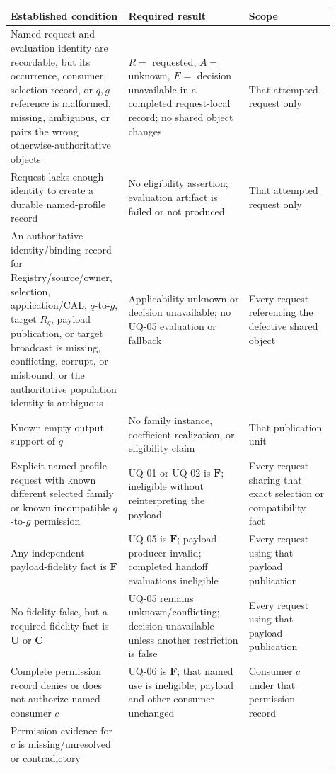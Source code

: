 \begin{longtable}{p{0.31\linewidth}p{0.35\linewidth}p{0.25\linewidth}}
\toprule
Established condition & Required result & Scope\\
\midrule
\endhead
Named request and evaluation identity are recordable, but its occurrence,
consumer, selection-record, or \(q,g\) reference is malformed, missing,
ambiguous, or pairs the wrong otherwise-authoritative objects &
\(R=\) requested, \(A=\) unknown, \(E=\) decision unavailable in a completed
request-local record; no shared object changes & That attempted request only\\
Request lacks enough identity to create a durable named-profile record &
No eligibility assertion; evaluation artifact is failed or not produced &
That attempted request only\\
An authoritative identity/binding record for Registry/source/owner,
selection, application/CAL, \(q\)-to-\(g\), target \(R_q\), payload
publication, or target broadcast is missing, conflicting, corrupt, or
misbound; or the authoritative population identity is ambiguous & Applicability unknown or decision
unavailable; no UQ-05 evaluation or fallback & Every request referencing the
defective shared object\\
Known empty output support of \(q\) & No family instance, coefficient
realization, or eligibility claim & That publication unit\\
Explicit named profile request with known different selected family or
known incompatible \(q\)-to-\(g\) permission & UQ-01 or UQ-02 is
\(\mathbf F\); ineligible without reinterpreting the payload & Every request
sharing that exact selection or compatibility fact\\
Any independent payload-fidelity fact is \(\mathbf F\) & UQ-05 is
\(\mathbf F\); payload producer-invalid; completed handoff evaluations
ineligible & Every request using that payload publication\\
No fidelity false, but a required fidelity fact is \(\mathbf U\) or
\(\mathbf C\) & UQ-05 remains unknown/conflicting; decision unavailable
unless another restriction is false & Every request using that payload
publication\\
Complete permission record denies or does not authorize named consumer \(c\)
& UQ-06 is \(\mathbf F\); that named use is ineligible; payload and other
consumer unchanged & Consumer \(c\) under that permission record\\
Permission evidence for \(c\) is missing/unresolved or contradictory &

\end{longtable}
